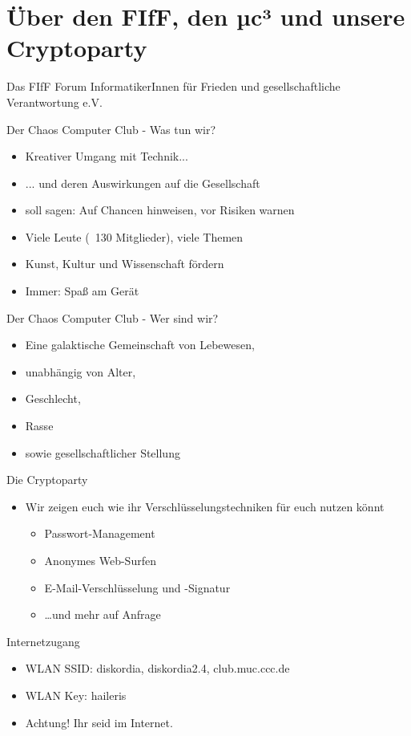 \section{Über den FIfF, den µc³ und unsere Cryptoparty}
  \begin{frame}{Das FIfF}
    Forum InformatikerInnen für Frieden und gesellschaftliche Verantwortung e.V.
  \end{frame}
  \begin{frame}{Der Chaos Computer Club - Was tun wir?}
    \begin{itemize}
      \item{Kreativer Umgang mit Technik...}
      \item{... und deren Auswirkungen auf die Gesellschaft}
      \item{soll sagen: Auf Chancen hinweisen, vor Risiken warnen}
      \item{Viele Leute (~130 Mitglieder), viele Themen}
      \item{Kunst, Kultur und Wissenschaft fördern}
      \item{Immer: Spaß am Gerät}
    \end{itemize}
  \end{frame}
  \begin{frame}{Der Chaos Computer Club - Wer sind wir?}
    \begin{itemize}
      \item{Eine galaktische Gemeinschaft von Lebewesen,}
      \item{unabhängig von Alter,}
      \item{Geschlecht,}
      \item{Rasse}
      \item{sowie gesellschaftlicher Stellung}
    \end{itemize}
  \end{frame}
  \begin{frame}{Die Cryptoparty}
    \begin{itemize}
      \item{Wir zeigen euch wie ihr Verschlüsselungstechniken für euch nutzen könnt}
      \begin{itemize}
        \item{Passwort-Management}
        \item{Anonymes Web-Surfen}
        \item{E-Mail-Verschlüsselung und -Signatur}
        \item{\ldots und mehr auf Anfrage}
      \end{itemize}
    \end{itemize}
  \end{frame}
  \begin{frame}{Internetzugang}
    \begin{itemize}
      \item{WLAN SSID: diskordia, diskordia2.4, club.muc.ccc.de}
      \item{WLAN Key: haileris}
      \item{Achtung! Ihr seid im Internet.}
    \end{itemize}
  \end{frame}


